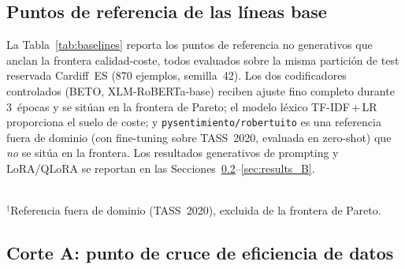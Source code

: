 \documentclass[conference]{IEEEtran}
\begin{document}
\subsection{Puntos de referencia de las líneas base}
\label{sec:results_baselines}

La Tabla~\ref{tab:baselines} reporta los puntos de referencia no generativos que
anclan la frontera calidad-coste, todos evaluados sobre la misma partición de
test reservada Cardiff~ES (870 ejemplos, semilla~42).
Los dos codificadores controlados (BETO, XLM-RoBERTa-base) reciben ajuste fino
completo durante 3~épocas y se sitúan en la frontera de Pareto; el modelo léxico
TF-IDF\,+\,LR proporciona el suelo de coste; y
\texttt{pysentimiento/robertuito} es una referencia fuera de dominio (con
fine-tuning sobre TASS~2020, evaluada en zero-shot) que \emph{no} se sitúa en la
frontera.
Los resultados generativos de prompting y LoRA/QLoRA se reportan en las
Secciones~\ref{sec:results_A}--\ref{sec:results_B}.

\begin{table}[t]
  \centering
  \caption{Resultados de las líneas base en el conjunto de test Cardiff~ES
    (semilla~42). A los codificadores se les hace ajuste fino completo durante
    3~épocas (lr~$=2\times10^{-5}$, lote~16).
    RoBERTuito es una referencia fuera de dominio, no en la frontera de Pareto.}
  \label{tab:baselines}
  \small
  \\[2pt]
  {\footnotesize $^{\dagger}$Referencia fuera de dominio (TASS~2020), excluida de la frontera de Pareto.}
\end{table}

\subsection{Corte A: punto de cruce de eficiencia de datos}
\label{sec:results_A}
\end{document}
